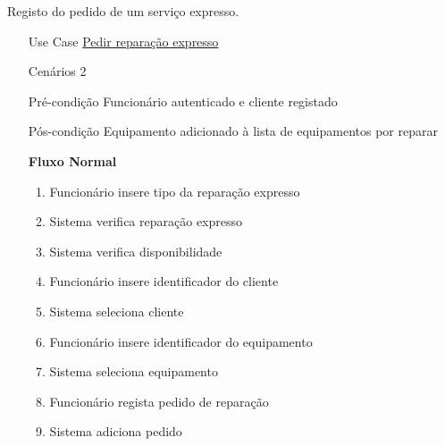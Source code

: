 \documentclass[../relatorio.tex]{subfiles}
\begin{document}
Registo do pedido de um serviço expresso.
\begin{itemize}
    \item[Use Case] {\underline{Pedir reparação expresso}}
    \item[Cenários] {2}
    \item[Pré-condição] {Funcionário autenticado e cliente registado}
    \item[Pós-condição] {Equipamento adicionado à lista de equipamentos por reparar}
          \begin{flushleft}
              \textbf{Fluxo Normal}
          \end{flushleft}
          \begin{enumerate}
              \item Funcionário insere tipo da reparação expresso 
              \item Sistema verifica reparação expresso
              \item Sistema verifica disponibilidade
              \item Funcionário insere identificador do cliente
              \item Sistema seleciona cliente
              \item Funcionário insere identificador do equipamento
              \item Sistema seleciona equipamento
              \item Funcionário regista pedido de reparação
              \item Sistema adiciona pedido
          \end{enumerate}


\end{itemize}
\end{document}

